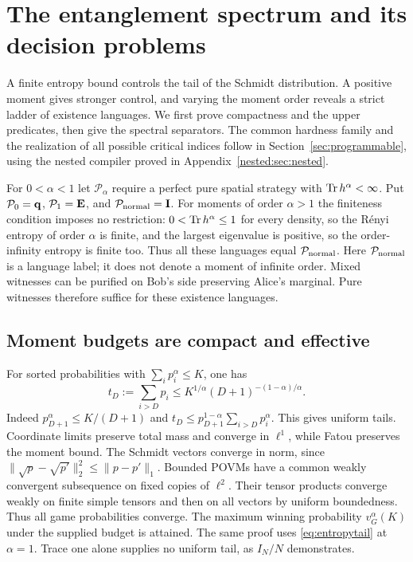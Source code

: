 \section{The entanglement spectrum and its decision problems}\label{sec:renyi}
A finite entropy bound controls the tail of the Schmidt distribution.
A positive moment gives stronger control, and varying the moment order
reveals a strict ladder of existence languages. We first prove compactness
and the upper predicates, then give the spectral separators. The common
hardness family and the realization of all possible critical indices
follow in Section~\ref{sec:programmable}, using the nested compiler proved
in Appendix~\ref{nested:sec:nested}.

For $0<\alpha<1$ let $\mathcal P_\alpha$ require a perfect pure spatial
strategy with $\operatorname{Tr} h^\alpha<\infty$. Put $\mathcal P_0=\mathbf q$,
$\mathcal P_1=\mathbf E$, and $\mathcal P_{\rm normal}=\mathbf I$.
For moments of order $\alpha>1$ the finiteness condition imposes no
restriction: $0<\operatorname{Tr} h^\alpha\le1$ for every density, so the R\'enyi
entropy of order $\alpha$ is finite, and the largest eigenvalue is
positive, so the order-infinity entropy is finite too. Thus all these
languages equal $\mathcal P_{\rm normal}$. Here $\mathcal P_{\rm normal}$
is a language label; it does not denote a moment of infinite order. Mixed witnesses can be purified on Bob's side preserving Alice's
marginal. Pure witnesses therefore suffice for these existence languages.

\subsection{Moment budgets are compact and effective}\label{sec:momentupper}
For sorted probabilities with $\sum_i p_i^\alpha\le K$, one has
\begin{equation}\label{eq:momenttail}
 t_D:=\sum_{i>D}p_i\le
 K^{1/\alpha}(D+1)^{-(1-\alpha)/\alpha}.
\end{equation}
Indeed $p_{D+1}^\alpha\le K/(D+1)$ and
$t_D\le p_{D+1}^{1-\alpha}\sum_{i>D}p_i^\alpha$.
This gives uniform tails. Coordinate limits preserve total mass and
converge in $\ell^1$, while Fatou preserves the moment bound. The Schmidt
vectors converge in norm, since
$\|\sqrt p-\sqrt{p'}\|_2^2\le\|p-p'\|_1$. Bounded POVMs have a common
weakly convergent subsequence on fixed copies of $\ell^2$. Their tensor
products converge weakly on finite simple tensors and then on all vectors
by uniform boundedness. Thus all game probabilities converge. The
maximum winning probability $v_G^\alpha(K)$ under the supplied budget
is attained. The same proof uses \eqref{eq:entropytail} at $\alpha=1$.
Trace one alone supplies no uniform tail, as $I_N/N$ demonstrates.


